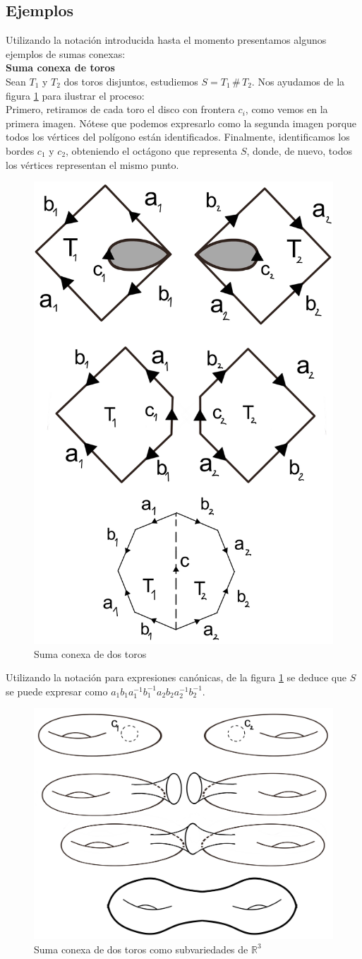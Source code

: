 \documentclass[a4paper,11pt,spanish, twoside, leqno]{tfg-uam}
\theoremstyle{definition}
\begin{document}
\subsection*{Ejemplos}
Utilizando la notación introducida hasta el momento presentamos algunos ejemplos de sumas conexas:
\\

\noindent \textbf{Suma conexa de toros}
\\
Sean $ T_1 $ y $ T_2 $ dos toros disjuntos, estudiemos $ S=T_1\, \# \, T_2 $. Nos ayudamos de la figura \ref{fig:suma conexa de toros planos} para ilustrar el proceso:\\
Primero, retiramos de cada toro el disco con frontera $c_i$, como vemos en la primera imagen. Nótese que podemos expresarlo como la segunda imagen porque todos los vértices del polígono están identificados. Finalmente, identificamos los bordes $ c_1 $ y $ c_2 $, obteniendo el octágono que representa  $ S $, donde, de nuevo, todos los vértices representan el mismo punto.


\begin{figure}[h!]
	\centering
	\includegraphics[width=0.4\linewidth]{imagenes/sumaconexa_toros.png}
	\caption{Suma conexa de dos toros}
	\label{fig:suma conexa de toros planos}
\end{figure} 

Utilizando la notación para expresiones canónicas, de la figura \ref{fig:suma conexa de toros planos} se deduce que  $ S $ se puede expresar como $ a_1 b_1 a_1^{-1}b_1^{-1}a_2 b_2 a_2^{-1} b_2^{-1}  $. 


\begin{figure}[h!]
	\centering
	\includegraphics[width=0.4\linewidth]{imagenes/sumaconexa_toros_R3.png}
	\caption{Suma conexa de dos toros como subvariedades de $ \mathbb{R}^3 $}
	\label{fig:suma conexa de toros en R3}
\end{figure} 
\end{document}
